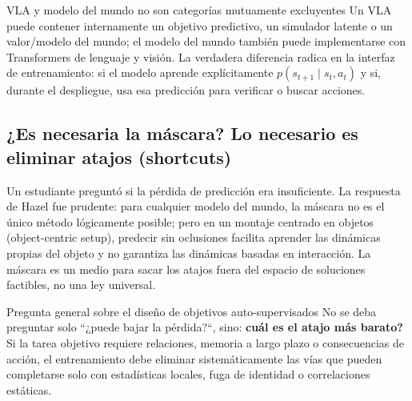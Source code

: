 
\begin{warningbox}{VLA y modelo del mundo no son categorías mutuamente excluyentes}
Un VLA puede contener internamente un objetivo predictivo, un simulador latente o un valor/modelo del mundo; el modelo del mundo también puede implementarse con Transformers de lenguaje y visión. La verdadera diferencia radica en la interfaz de entrenamiento: si el modelo aprende explícitamente $p(s_{t+1}\mid s_t,a_t)$ y si, durante el despliegue, usa esa predicción para verificar o buscar acciones.
\end{warningbox}

\subsection{¿Es necesaria la máscara? Lo necesario es eliminar atajos (shortcuts)}

Un estudiante preguntó si la pérdida de predicción era insuficiente. La respuesta de Hazel fue prudente: para cualquier modelo del mundo, la máscara no es el único método lógicamente posible; pero en un montaje centrado en objetos (object-centric setup), predecir sin oclusiones facilita aprender las dinámicas propias del objeto y no garantiza las dinámicas basadas en interacción. La máscara es un medio para sacar los atajos fuera del espacio de soluciones factibles, no una ley universal.


\begin{importantbox}{Pregunta general sobre el diseño de objetivos auto-supervisados}
No se deba preguntar solo ``¿puede bajar la pérdida?``, sino: \textbf{cuál es el atajo más barato?} Si la tarea objetivo requiere relaciones, memoria a largo plazo o consecuencias de acción, el entrenamiento debe eliminar sistemáticamente las vías que pueden completarse solo con estadísticas locales, fuga de identidad o correlaciones estáticas.
\end{importantbox}

